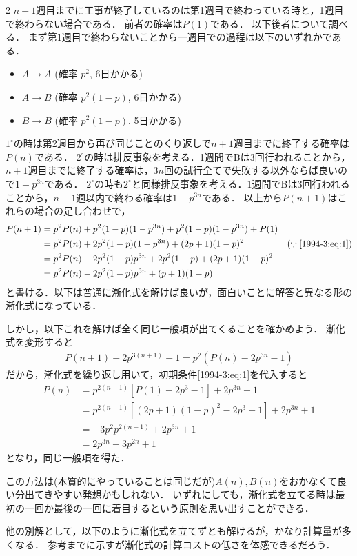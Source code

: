 \documentclass[../../../../main.tex]{subfiles}
\begin{document}
\begin{multicols}{2}
  $n+1$週目までに工事が終了しているのは第1週目で終わっている時と，1週目で終わらない場合である．
  前者の確率は$P(1)$である．
  以下後者について調べる．
  まず第1週目で終わらないことから一週目での過程は以下のいずれかである．
  \begin{itemize}
    \item[$1^{\circ}$] $A \to A$ (確率 $p^2$, 6日かかる)
    \item[$2^{\circ}$] $A \to B$ (確率 $p^2(1-p)$, 6日かかる)
    \item[$3^{\circ}$] $B \to B$ (確率 $p^2(1-p)$, 5日かかる)
  \end{itemize}
  $1^{\circ}$の時は第2週目から再び同じことのくり返しで$n+1$週目までに終了する確率は$P(n)$である．
  $2^{\circ}$の時は排反事象を考える．1週間でBは3回行われることから，$n+1$週目までに終了する確率は，$3n$回の試行全てで失敗する以外ならば良いので$1-p^{3n}$である．
  $2^{\circ}$の時も$2^{\circ}$と同様排反事象を考える．1週間でBは3回行われることから，$n+1$週以内で終わる確率は$1-p^{3n}$である．
  以上から$P(n+1)$はこれらの場合の足し合わせで，
  \begin{align*}
    P(n+1)
     & = p^2 P(n) + p^2(1-p)(1-p^{3n}) + p^2(1-p)(1-p^{3n}) + P(1) &                                      \\
     & = p^2 P(n) + 2p^2(1-p)(1-p^{3n}) + (2p+1)(1-p)^2            & (\because \text{\cref{1994-3:eq:1}}) \\
     & = p^2 P(n) - 2p^2(1-p)p^{3n} + 2p^2(1-p) + (2p+1)(1-p)^2    &                                      \\
     & = p^2 P(n) - 2p^2(1-p)p^{3n} + (p+1)(1-p)                   &
  \end{align*}
  と書ける．以下は普通に漸化式を解けば良いが，面白いことに解答と異なる形の漸化式になっている．

  しかし，以下これを解けば全く同じ一般項が出てくることを確かめよう．
  漸化式を変形すると
  \begin{align*}
    P(n+1) - 2p^{3(n+1)}-1 = p^2\left(P(n)-2p^{3n}-1\right)
  \end{align*}
  だから，漸化式を繰り返し用いて，初期条件\cref{1994-3:eq:1}を代入すると
  \begin{align*}
    P(n)
     & = p^{2(n-1)}\left[P(1)-2p^{3}-1\right] + 2p^{3n} + 1           \\
     & = p^{2(n-1)}\left[(2p+1)(1-p)^2 -2p^{3}-1\right] + 2p^{3n} + 1 \\
     & = -3p^2p^{2(n-1)}+ 2p^{3n} + 1                                 \\
     & = 2p^{3n} -3p^{2n}+  1
  \end{align*}
  となり，同じ一般項を得た．

  この方法は(本質的にやっていることは同じだが)$A(n),B(n)$をおかなくて良い分出てきやすい発想かもしれない．
  いずれにしても，漸化式を立てる時は最初の一回か最後の一回に着目するという原則を思い出すことができる．

  \vspace{10pt}
  他の別解として，以下のように漸化式を立てずとも解けるが，かなり計算量が多くなる．
  参考までに示すが漸化式の計算コストの低さを体感できるだろう．



  \newpage
\end{multicols}
\end{document}
